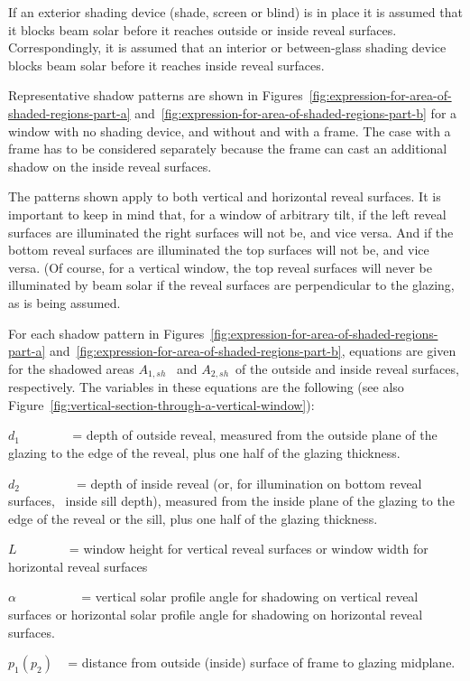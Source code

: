 If an exterior shading device (shade, screen or blind) is in place it is assumed that it blocks beam solar before it reaches outside or inside reveal surfaces. Correspondingly, it is assumed that an interior or between-glass shading device blocks beam solar before it reaches inside reveal surfaces.

Representative shadow patterns are shown in Figures~\ref{fig:expression-for-area-of-shaded-regions-part-a} and~\ref{fig:expression-for-area-of-shaded-regions-part-b} for a window with no shading device, and without and with a frame. The case with a frame has to be considered separately because the frame can cast an additional shadow on the inside reveal surfaces.

The patterns shown apply to both vertical and horizontal reveal surfaces. It is important to keep in mind that, for a window of arbitrary tilt, if the left reveal surfaces are illuminated the right surfaces will not be, and vice versa. And if the bottom reveal surfaces are illuminated the top surfaces will not be, and vice versa. (Of course, for a vertical window, the top reveal surfaces will never be illuminated by beam solar if the reveal surfaces are perpendicular to the glazing, as is being assumed.

For each shadow pattern in Figures~\ref{fig:expression-for-area-of-shaded-regions-part-a} and~\ref{fig:expression-for-area-of-shaded-regions-part-b}, equations are given for the shadowed areas \({A_{1,sh}}\) ~and \emph{\({A_{2,sh}}\)}~of the outside and inside reveal surfaces, respectively. The variables in these equations are the following (see also Figure~\ref{fig:vertical-section-through-a-vertical-window}):

\({d_1}\) ~~~~~~~ = depth of outside reveal, measured from the outside plane of the glazing to the edge of the reveal, plus one half of the glazing thickness.

\({d_2}\) ~~ ~~~~~ = depth of inside reveal (or, for illumination on bottom reveal surfaces,~ inside sill depth), measured from the inside plane of the glazing to the edge of the reveal or the sill, plus one half of the glazing thickness.

\(L\) ~~~~~~~ = window height for vertical reveal surfaces or window width for horizontal reveal surfaces

\(\alpha\) ~~~~~~~~~ = vertical solar profile angle for shadowing on vertical reveal surfaces or horizontal solar profile angle for shadowing on horizontal reveal surfaces.

\({p_1}({p_2})\) ~ = distance from outside (inside) surface of frame to glazing midplane.

